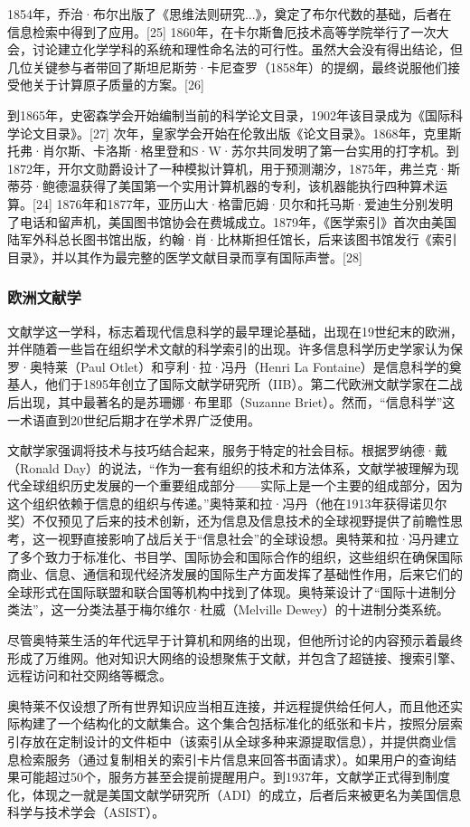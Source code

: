 1854年，乔治·布尔出版了《思维法则研究...》，奠定了布尔代数的基础，后者在信息检索中得到了应用。[25] 1860年，在卡尔斯鲁厄技术高等学院举行了一次大会，讨论建立化学学科的系统和理性命名法的可行性。虽然大会没有得出结论，但几位关键参与者带回了斯坦尼斯劳·卡尼查罗（1858年）的提纲，最终说服他们接受他关于计算原子质量的方案。[26]

到1865年，史密森学会开始编制当前的科学论文目录，1902年该目录成为《国际科学论文目录》。[27] 次年，皇家学会开始在伦敦出版《论文目录》。1868年，克里斯托弗·肖尔斯、卡洛斯·格里登和S·W·苏尔共同发明了第一台实用的打字机。到1872年，开尔文勋爵设计了一种模拟计算机，用于预测潮汐，1875年，弗兰克·斯蒂芬·鲍德温获得了美国第一个实用计算机器的专利，该机器能执行四种算术运算。[24] 1876年和1877年，亚历山大·格雷厄姆·贝尔和托马斯·爱迪生分别发明了电话和留声机，美国图书馆协会在费城成立。1879年，《医学索引》首次由美国陆军外科总长图书馆出版，约翰·肖·比林斯担任馆长，后来该图书馆发行《索引目录》，并以其作为最完整的医学文献目录而享有国际声誉。[28]
\subsubsection{欧洲文献学}  
文献学这一学科，标志着现代信息科学的最早理论基础，出现在19世纪末的欧洲，并伴随着一些旨在组织学术文献的科学索引的出现。许多信息科学历史学家认为保罗·奥特莱（Paul Otlet）和亨利·拉·冯丹（Henri La Fontaine）是信息科学的奠基人，他们于1895年创立了国际文献学研究所（IIB）。第二代欧洲文献学家在二战后出现，其中最著名的是苏珊娜·布里耶（Suzanne Briet）。然而，“信息科学”这一术语直到20世纪后期才在学术界广泛使用。

文献学家强调将技术与技巧结合起来，服务于特定的社会目标。根据罗纳德·戴（Ronald Day）的说法，“作为一套有组织的技术和方法体系，文献学被理解为现代全球组织历史发展的一个重要组成部分——实际上是一个主要的组成部分，因为这个组织依赖于信息的组织与传递。”奥特莱和拉·冯丹（他在1913年获得诺贝尔奖）不仅预见了后来的技术创新，还为信息及信息技术的全球视野提供了前瞻性思考，这一视野直接影响了战后关于“信息社会”的全球设想。奥特莱和拉·冯丹建立了多个致力于标准化、书目学、国际协会和国际合作的组织，这些组织在确保国际商业、信息、通信和现代经济发展的国际生产方面发挥了基础性作用，后来它们的全球形式在国际联盟和联合国等机构中找到了体现。奥特莱设计了“国际十进制分类法”，这一分类法基于梅尔维尔·杜威（Melville Dewey）的十进制分类系统。

尽管奥特莱生活的年代远早于计算机和网络的出现，但他所讨论的内容预示着最终形成了万维网。他对知识大网络的设想聚焦于文献，并包含了超链接、搜索引擎、远程访问和社交网络等概念。

奥特莱不仅设想了所有世界知识应当相互连接，并远程提供给任何人，而且他还实际构建了一个结构化的文献集合。这个集合包括标准化的纸张和卡片，按照分层索引存放在定制设计的文件柜中（该索引从全球多种来源提取信息），并提供商业信息检索服务（通过复制相关的索引卡片信息来回答书面请求）。如果用户的查询结果可能超过50个，服务方甚至会提前提醒用户。到1937年，文献学正式得到制度化，体现之一就是美国文献学研究所（ADI）的成立，后者后来被更名为美国信息科学与技术学会（ASIST）。